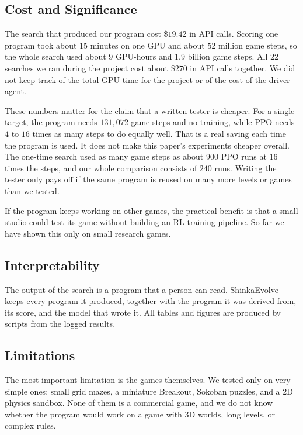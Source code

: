 \documentclass{article}
\begin{document}
\subsection{Cost and Significance}
\label{sec:significance}
The search that produced our program cost \$$19.42$ in API calls. Scoring one program took about $15$ minutes on one GPU
and about $52$ million game steps, so the whole search used about $9$ GPU-hours and $1.9$ billion game steps. All $22$
searches we ran during the project cost about \$$270$ in API calls together. We did not keep track of the total GPU
time for the project or of the cost of the driver agent.

These numbers matter for the claim that a written tester is cheaper. For a single target, the program needs
$131{,}072$ game steps and no training, while PPO needs $4$ to $16$ times as many steps to do equally well. That is a
real saving each time the program is used. It does not make this paper's experiments cheaper overall. The one-time
search used as many game steps as about $900$ PPO runs at $16$ times the steps, and our whole comparison consists of
$240$ runs. Writing the tester only pays off if the same program is reused on many more levels or games than we tested.

If the program keeps working on other games, the practical benefit is that a small studio could test its game without
building an RL training pipeline. So far we have shown this only on small research games.

\subsection{Interpretability}
\label{sec:interp}
The output of the search is a program that a person can read. ShinkaEvolve keeps every program it produced, together
with the program it was derived from, its score, and the model that wrote it. All tables and figures are produced by
scripts from the logged results.

\subsection{Limitations}
\label{sec:limits}
The most important limitation is the games themselves. We tested only on very simple ones: small grid mazes, a
miniature Breakout, Sokoban puzzles, and a 2D physics sandbox. None of them is a commercial game, and we do not know
whether the program would work on a game with 3D worlds, long levels, or complex rules.
\end{document}
